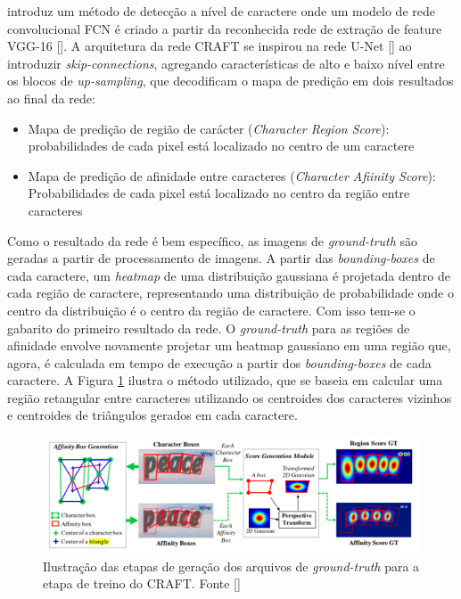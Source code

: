 \citeauthor{CRAFT} introduz um método de detecção a nível de caractere onde um modelo de rede convolucional FCN é criado a partir da reconhecida rede de extração de feature VGG-16 []. A arquitetura da rede CRAFT se inspirou na rede U-Net [] ao introduzir \textit{skip-connections}, agregando características de alto e baixo nível entre os blocos de \textit{up-sampling}, que decodificam o mapa de predição em dois resultados ao final da rede:

\begin{itemize}
    \item {Mapa de predição de região de carácter (\textit{Character Region Score}): probabilidades de cada pixel está localizado no centro de um caractere}
    \item {Mapa de predição de afinidade entre caracteres (\textit{Character Afiinity Score}): Probabilidades de cada  pixel está localizado no centro da região entre caracteres}
\end{itemize}

Como o resultado da rede é bem específico, as imagens de \textit{ground-truth} são geradas a partir de processamento de imagens. A partir das \textit{bounding-boxes} de cada caractere, um \textit{heatmap} de uma distribuição gaussiana é projetada dentro de cada região de caractere, representando uma distribuição de probabilidade onde o centro da distribuição é o centro da região de caractere. Com isso tem-se o gabarito do primeiro resultado da rede. O \textit{ground-truth} para as regiões de afinidade envolve novamente projetar um heatmap gaussiano em uma região que, agora, é calculada em tempo de execução a partir dos \textit{bounding-boxes} de cada caractere. A Figura \ref{fig:craft_gt}  ilustra o método utilizado, que se baseia em calcular uma região retangular entre caracteres utilizando os centroides dos caracteres vizinhos e centroides de triângulos gerados em cada caractere.

\begin{figure}
    \centering
    \includegraphics[width=\textwidth]{figs/craft-gt.png}
    \caption{Ilustração das etapas de geração dos arquivos de \textit{ground-truth} para a etapa de treino do CRAFT. Fonte []}
    \label{fig:craft_gt}
\end{figure}

